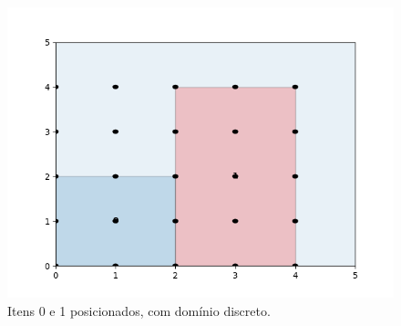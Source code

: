 \begin{figure}[H]
    \centering
    \includegraphics[scale=0.5]{utils/images/discrete_example}
    \caption{Itens 0 e 1 posicionados, com domínio discreto.}
    \label{fig:sobreposicao-dominio4}
\end{figure}
